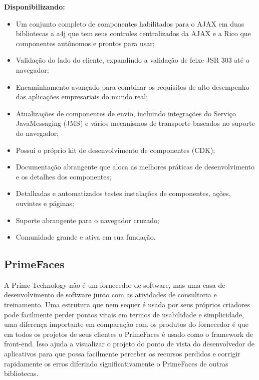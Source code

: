 \documentclass[12pt,a4paper]{article}
\begin{document}
\textbf{Disponibilizando:}
\begin{itemize}
\item Um conjunto completo de componentes habilitados para o AJAX em duas bibliotecas a a4j que tem seus controles centralizados da AJAX e a Rico que componentes autônomos e prontos para usar;

\item Validação do lado do cliente, expandindo a validação de feixe JSR 303 até o navegador;
\item Encaminhamento avançado para combinar os requisitos de alto desempenho das aplicações empresariais do mundo real;

\item Atualizações de componentes de envio, incluindo integrações do Serviço JavaMessaging (JMS) e vários mecanismos de transporte baseados no suporte do navegador;

\item Possui o próprio kit de desenvolvimento de componentes (CDK);

\item Documentação abrangente que aloca as melhores práticas de desenvolvimento e os detalhes dos componentes;

\item Detalhadas e automatizados testes instalações de componentes, ações, ouvintes e páginas;

\item Suporte abrangente para o navegador cruzado;

\item Comunidade grande e ativa em sua fundação.
\end{itemize}

\subsection{PrimeFaces}
A Prime Technology não é um fornecedor de software, mas uma casa de desenvolvimento de software junto com as atividades de consultoria e treinamento. Uma estrutura que nem sequer é usada por seus próprios criadores pode facilmente perder pontos vitais em termos de usabilidade e simplicidade, uma diferença importante em comparação com os produtos do fornecedor é que em todos os projetos de seus clientes o PrimeFaces é usado como o framework de front-end. Isso ajuda a visualizar o projeto do ponto de vista do desenvolvedor de aplicativos para que possa facilmente perceber os recursos perdidos e corrigir rapidamente os erros diferindo significativamente o PrimeFaces de outras bibliotecas.
\end{document}

